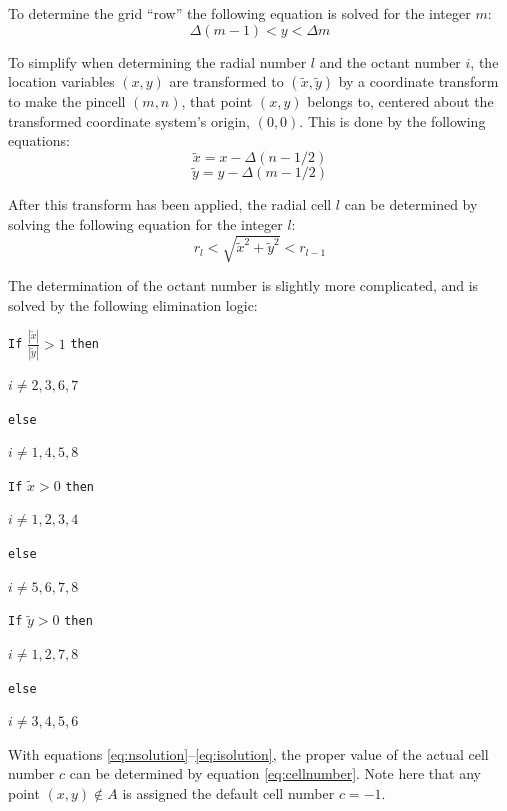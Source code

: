 \documentclass{article}
\begin{document}
To determine the grid ``row'' the following equation is solved for the integer $m$:
\begin{equation}
\Delta (m-1)<y<\Delta m
\label{eq:msolution}
\end{equation}

To simplify when determining the radial number $l$ and the octant number $i$, the location variables $(x,y)$ are transformed to $(\tilde{x},\tilde{y})$ by a coordinate transform to make the pincell $(m,n)$, that point $(x,y)$ belongs to, centered about the transformed coordinate system's origin, $(0,0)$. 
This is done by the following equations:
\begin{equation}
\tilde{x}=x-\Delta (n-1/2)
\label{eq:xtransform}
\end{equation}
\begin{equation}
\tilde{y}=y-\Delta (m-1/2)
\label{eq:ytransform}
\end{equation}

After this transform has been applied, the radial cell $l$ can be determined by solving the following equation for the integer $l$:
\begin{equation}
r_l<\sqrt{\tilde{x}^2+\tilde{y}^2}<r_{l-1}
\label{eq:lsolution}
\end{equation}

The determination of the octant number is slightly more complicated, and is solved by the following elimination logic:

\vspace{5mm}
\texttt{If} $\frac{|\tilde{x}|}{|\tilde{y}|} > 1$ \texttt{then}

\qquad $i\ne 2, 3, 6, 7$

\texttt{else}

\qquad $i\ne 1, 4, 5, 8$

\texttt{If} $\tilde{x} > 0$ \texttt{then}

\qquad $i\ne 1, 2, 3, 4$

\texttt{else}

\qquad $i\ne 5, 6, 7, 8$

\texttt{If} $\tilde{y} > 0$ \texttt{then}

\qquad $i\ne 1, 2, 7, 8$

\texttt{else}

\qquad $i\ne 3, 4, 5, 6$
\begin{equation}
\label{eq:isolution}
\end{equation}

With equations \ref{eq:nsolution}--\ref{eq:isolution}, the proper value of the actual cell number $c$ can be determined by equation \ref{eq:cellnumber}. 
Note here that any point $(x,y)\notin A$ is assigned the default cell number $c=-1$.
\end{document}
